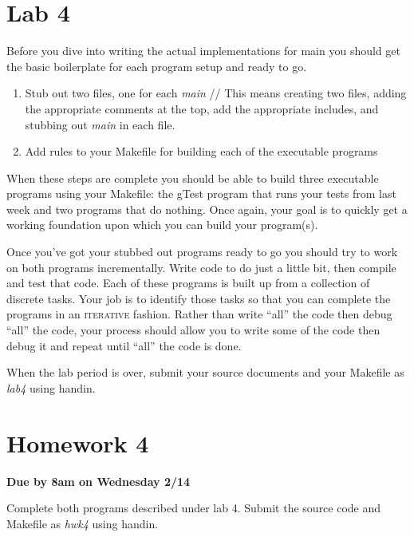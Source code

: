 \documentclass[nobib]{tufte-handout}
\begin{document}
\newpage \thispagestyle{empty}

\section{Lab 4}

Before you dive into writing the actual implementations for main you should get the basic boilerplate for each program setup and ready to go.
\begin{enumerate}
\item Stub out two files, one for each \textit{main} //
This means creating two files, adding the appropriate comments at the top, add the appropriate includes, and stubbing out \textit{main} in each file.

\item Add rules to your Makefile for building each of the executable programs
\end{enumerate}
When these steps are complete you should be able to build three executable programs using your Makefile: the gTest program that runs your tests from last week and two programs that do nothing. Once again, your goal is to quickly get a working foundation upon which you can build your program(s).

Once you've got your stubbed out programs ready to go you should try to work on both programs incrementally. Write code to do just a little bit, then compile and test that code. Each of these programs is built up from a collection of discrete tasks. Your job is to identify those tasks so that you can complete the programs in an \textsc{iterative} fashion. Rather than write ``all'' the code then debug ``all'' the code, your process should allow you to write some of the code then debug it and repeat until ``all'' the code is done.

When the lab period is over, submit your source documents and your Makefile as \textit{lab4} using handin.
\newpage \thispagestyle{empty}

\section{Homework 4}

\begin{center}
\textbf{Due by 8am on Wednesday 2/14}
\end{center}

Complete both programs described under lab 4. Submit the source code and Makefile as \textit{hwk4} using handin.
\end{document}
